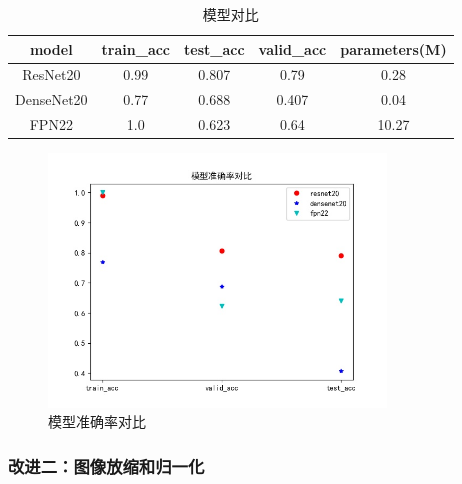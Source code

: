\documentclass{article}
\begin{document}
\begin{CJK}{UTF8}{gbsn}
\begin{table}[!ht]
\centering
\begin{tabular}{|c|c|c|c|c|}
\hline
model      & train\_acc & test\_acc & valid\_acc & parameters(M) \\ \hline
ResNet20   & 0.99       & 0.807     & 0.79       & 0.28          \\ \hline
DenseNet20 & 0.77       & 0.688     & 0.407      & 0.04          \\ \hline
FPN22      & 1.0        & 0.623     & 0.64       & 10.27         \\ \hline
\end{tabular}
\caption{模型对比}
\label{tab:model-test}
\end{table}


\begin{figure}[!ht]
    \centering
    \includegraphics[width=0.8\textwidth]{figures/model_vs_acc.jpg}
    \caption{模型准确率对比}
    \label{vs-acc}
\end{figure}


\subsubsection{改进二：图像放缩和归一化}\label{300*300}


\end{CJK}
\end{document}
